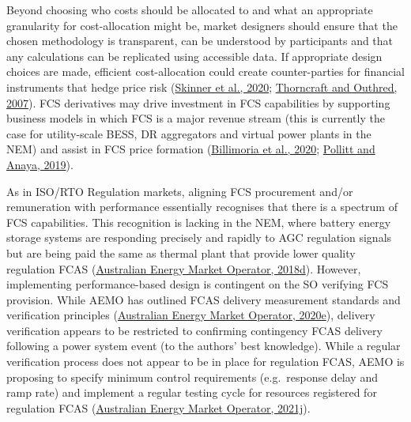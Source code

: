 \documentclass[12pt,a4paper,]{report}
\begin{document}
Beyond choosing who costs should be allocated to and what an appropriate
granularity for cost-allocation might be, market designers should ensure
that the chosen methodology is transparent, can be understood by
participants and that any calculations can be replicated using
accessible data. If appropriate design choices are made, efficient
cost-allocation could create counter-parties for financial instruments
that hedge price risk
(\protect\hyperlink{ref-skinnerIncorporatingNewPower2020}{Skinner et
al., 2020};
\protect\hyperlink{ref-thorncraftExperienceMarketbasedAncillary2007}{Thorncraft
and Outhred, 2007}). FCS derivatives may drive investment in FCS
capabilities by supporting business models in which FCS is a major
revenue stream (this is currently the case for utility-scale BESS, DR
aggregators and virtual power plants in the NEM) and assist in FCS price
formation
(\protect\hyperlink{ref-billimoriaMarketDesignSystem2020}{Billimoria et
al., 2020};
\protect\hyperlink{ref-pollittCompetitionMarketsAncillary2019}{Pollitt
and Anaya, 2019}).

As in ISO/RTO Regulation markets, aligning FCS procurement and/or
remuneration with performance essentially recognises that there is a
spectrum of FCS capabilities. This recognition is lacking in the NEM,
where battery energy storage systems are responding precisely and
rapidly to AGC regulation signals but are being paid the same as thermal
plant that provide lower quality regulation FCAS
(\protect\hyperlink{ref-australianenergymarketoperatorInitialOperationHornsdale2018}{Australian
Energy Market Operator, 2018d}). However, implementing performance-based
design is contingent on the SO verifying FCS provision. While AEMO has
outlined FCAS delivery measurement standards and verification principles
(\protect\hyperlink{ref-australianenergymarketoperatorMarketAncillaryService2020a}{Australian
Energy Market Operator, 2020e}), delivery verification appears to be
restricted to confirming contingency FCAS delivery following a power
system event (to the authors' best knowledge). While a regular
verification process does not appear to be in place for regulation FCAS,
AEMO is proposing to specify minimum control requirements (e.g.~response
delay and ramp rate) and implement a regular testing cycle for resources
registered for regulation FCAS
(\protect\hyperlink{ref-australianenergymarketoperatorAmendmentMarketAncillary2021}{Australian
Energy Market Operator, 2021j}).
\end{document}
